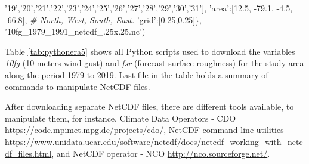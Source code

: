 \documentclass[12pt,oneside]{reedthesis}
\newenvironment{Shaded}{\begin{snugshade}}{\end{snugshade}}
\newcommand{\CommentTok}[1]{\textcolor[rgb]{0.56,0.35,0.01}{\textit{#1}}}
\newcommand{\FloatTok}[1]{\textcolor[rgb]{0.00,0.00,0.81}{#1}}
\newcommand{\NormalTok}[1]{#1}
\newcommand{\StringTok}[1]{\textcolor[rgb]{0.31,0.60,0.02}{#1}}
\begin{document}
\begin{Shaded}
\begin{Highlighting}[]
              \StringTok{'19'}\NormalTok{,}\StringTok{'20'}\NormalTok{,}\StringTok{'21'}\NormalTok{,}\StringTok{'22'}\NormalTok{,}\StringTok{'23'}\NormalTok{,}\StringTok{'24'}\NormalTok{,}\StringTok{'25'}\NormalTok{,}\StringTok{'26'}\NormalTok{,}\StringTok{'27'}\NormalTok{,}\StringTok{'28'}\NormalTok{,}\StringTok{'29'}\NormalTok{,}\StringTok{'30'}\NormalTok{,}\StringTok{'31'}\NormalTok{],}
       \StringTok{'area'}\NormalTok{:[}\FloatTok{12.5}\NormalTok{, }\FloatTok{-79.1}\NormalTok{, }\FloatTok{-4.5}\NormalTok{, }\FloatTok{-66.8}\NormalTok{], }\CommentTok{# North, West, South, East.}
       \StringTok{'grid'}\NormalTok{:[}\FloatTok{0.25}\NormalTok{,}\FloatTok{0.25}\NormalTok{]\},}
      \StringTok{'10fg_1979_1991_netcdf_.25x.25.nc'}\NormalTok{)}
\end{Highlighting}
\end{Shaded}
\normalsize

Table \ref{tab:pythonera5} shows all Python scripts used to download the variables \emph{10fg} (10 meters wind gust) and \emph{fsr} (forecast surface roughness) for the study area along the period 1979 to 2019. Last file in the table holds a summary of commands to manipulate NetCDF files.

After downloading separate NetCDF files, there are different tools available, to manipulate them, for instance, Climate Data Operators - CDO \url{https://code.mpimet.mpg.de/projects/cdo/}, NetCDF command line utilities \url{https://www.unidata.ucar.edu/software/netcdf/docs/netcdf_working_with_netcdf_files.html}, and NetCDF operator - NCO \url{http://nco.sourceforge.net/}.
\end{document}
